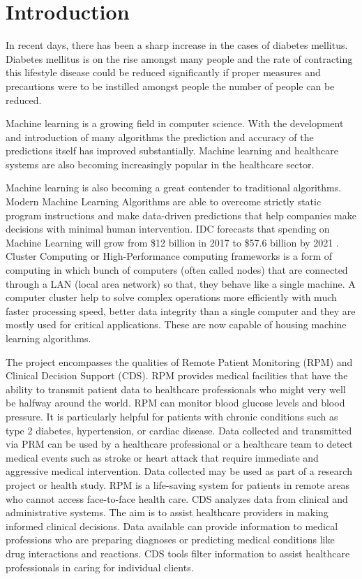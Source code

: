 \documentclass[12pt]{article}
\begin{document}
\section{Introduction}
In recent days, there has been a sharp increase in the cases of diabetes mellitus. Diabetes mellitus is on the rise amongst many people and the rate of contracting this lifestyle disease could be reduced significantly if proper measures and precautions were to be instilled amongst people the number of people can be reduced.

Machine learning is a growing field in computer science. With the development and introduction of many algorithms the prediction and accuracy of the predictions itself has improved substantially. Machine learning and healthcare systems are also becoming increasingly popular in the healthcare sector.

Machine learning is also becoming a great contender to traditional algorithms. Modern Machine Learning Algorithms are able to overcome strictly static program instructions and make data-driven predictions that help companies make decisions with minimal human intervention. IDC forecasts that spending on Machine Learning will grow from \$12 billion in 2017 to \$57.6 billion by 2021 \cite{dzone}. Cluster Computing or High-Performance computing frameworks is a form of computing in which bunch of computers (often called nodes) that are connected through a LAN (local area network) so that, they behave like a single machine. A computer cluster help to solve complex operations more efficiently with much faster processing speed, better data integrity than a single computer and they are mostly used for critical applications. These are now capable of housing machine learning algorithms.

The project encompasses the qualities of Remote Patient Monitoring (RPM)\cite{rpm} and Clinical Decision Support (CDS)\cite{cds}. RPM provides medical facilities that have the ability to transmit patient data to healthcare professionals who might very well be halfway around the world. RPM can monitor blood glucose levels and blood pressure. It is particularly helpful for patients with chronic conditions such as type 2 diabetes, hypertension, or cardiac disease. Data collected and transmitted via PRM can be used by a healthcare professional or a healthcare team to detect medical events such as stroke or heart attack that require immediate and aggressive medical intervention. Data collected may be used as part of a research project or health study. RPM is a life-saving system for patients in remote areas who cannot access face-to-face health care. CDS analyzes data from clinical and administrative systems. The aim is to assist healthcare providers in making informed clinical decisions. Data available can provide information to medical professions who are preparing diagnoses or predicting medical conditions like drug interactions and reactions. CDS tools filter information to assist healthcare professionals in caring for individual clients. 
\end{document}
